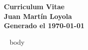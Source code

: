 \documentclass[11pt,spanish]{article}
\begin{document}
\begin{center}
\huge\bf\color{maingrey} Curriculum Vitae \\
\Huge\bf\color{maincolor} Juan Martín Loyola \\
\vspace{3mm}
\small \color{maingrey} Generado el \today
\end{center}


~{{ body }}~
\end{document}
